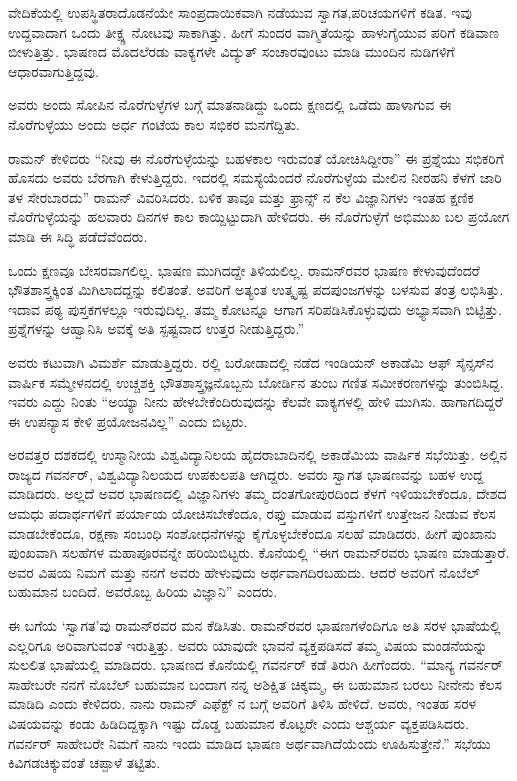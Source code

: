 ವೇದಿಕೆಯಲ್ಲಿ ಉಪಸ್ಥಿತರಾದೊಡನೆಯೇ ಸಾಂಪ್ರದಾಯಿಕವಾಗಿ ನಡೆಯುವ ಸ್ವಾಗತ,\break ಪರಿಚಯಗಳಿಗೆ ಕಡಿತ. ಇವು ಉದ್ದವಾದಾಗ ಒಂದು ತೀಕ್ಷ್ಣ ನೋಟವು ಸಾಕಾಗಿತ್ತು. ಹೀಗೆ ಸುಂದರ ವಾಗ್ಮಿತೆಯನ್ನು ಹಾಳುಗೈಯುವ ಪರಿಗೆ ಕಡಿವಾಣ ಬೀಳುತ್ತಿತ್ತು. ಭಾಷಣದ ಮೊದಲೆರಡು ವಾಕ್ಯಗಳೇ ವಿದ್ಯುತ್ ಸಂಚಾರವುಂಟು ಮಾಡಿ ಮುಂದಿನ ನುಡಿಗಳಿಗೆ ಆಧಾರವಾಗುತ್ತಿದ್ದವು.

ಅವರು ಅಂದು ಸೋಪಿನ ನೊರೆಗುಳ್ಳೆಗಳ ಬಗ್ಗೆ ಮಾತನಾಡಿದ್ದು ಒಂದು ಕ್ಷಣದಲ್ಲಿ ಒಡೆದು ಹಾಳಾಗುವ ಈ ನೊರೆಗುಳ್ಳೆಯು ಅಂದು ಅರ್ಧ ಗಂಟೆಯ ಕಾಲ ಸಭಿಕರ ಮನಗೆದ್ದಿತು.

ರಾಮನ್ ಕೇಳಿದರು  “ನೀವು ಈ ನೊರೆಗುಳ್ಳೆಯನ್ನು ಬಹಳಕಾಲ ಇರುವಂತೆ ಯೋಚಿಸಿದ್ದೀರಾ” ಈ ಪ್ರಶ್ನೆಯು ಸಭಿಕರಿಗೆ ಹೊಸದು ಅವರು ಬೆರಗಾಗಿ ಕೇಳುತ್ತಿದ್ದರು. ಇದರಲ್ಲಿ ಸಮಸ್ಯೆಯೆಂದರೆ ನೊರೆಗುಳ್ಳೆಯ ಮೇಲಿನ ನೀರಹನಿ ಕೆಳಗೆ ಜಾರಿ ತಳ ಸೇರಬಾರದು” \enginline{-}ರಾಮನ್ ವಿವರಿಸಿದರು. ಬಳಿಕ ತಾವೂ ಮತ್ತು ಫ್ರಾನ್ಸ್ ನ ಕೆಲ ವಿಜ್ಞಾನಿಗಳು ಇಂತಹ ಕ್ಷಣಿಕ ನೊರೆಗುಳ್ಳೆಯನ್ನು ಹಲವಾರು ದಿನಗಳ ಕಾಲ ಕಾಯ್ದಿಟ್ಟುದಾಗಿ ಹೇಳಿದರು. ಈ ನೊರೆಗುಳ್ಳೆಗೆ ಅಭಿಮುಖ ಬಲ ಪ್ರಯೋಗ ಮಾಡಿ ಈ ಸಿದ್ಧಿ ಪಡೆದೆವೆಂದರು.

ಒಂದು ಕ್ಷಣವೂ ಬೇಸರವಾಗಲಿಲ್ಲ. ಭಾಷಣ ಮುಗಿದದ್ದೇ ತಿಳಿಯಲಿಲ್ಲ. ರಾಮನ್‍ರವರ ಭಾಷಣ ಕೇಳುವುದೆಂದರೆ ಭೌತಶಾಸ್ತ್ರಕ್ಕಿಂತ ಮಿಗಿಲಾದದ್ದನ್ನು ಕಲಿತಂತೆ. ಅವರಿಗೆ ಅತ್ಯಂತ ಉತ್ಕೃಷ್ಟ ಪದಪುಂಜಗಳನ್ನು ಬಳಸುವ ತಂತ್ರ ಲಭಿಸಿತ್ತು. ಇದಾವ ಪಠ್ಯ ಪುಸ್ತಕಗಳಲ್ಲೂ ಇರುವುದಿಲ್ಲ. ತಮ್ಮ ಕೋಟನ್ನೂ ಆಗಾಗ ಸರಿಪಡಿಸಿಕೊಳ್ಳುವುದು ಅಭ್ಯಾಸವಾಗಿ ಬಿಟ್ಟಿತ್ತು. ಪ್ರಶ್ನೆಗಳನ್ನು ಆಹ್ವಾನಿಸಿ ಅವಕ್ಕೆ ಅತಿ ಸ್ಪಷ್ಟವಾದ ಉತ್ತರ ನೀಡುತ್ತಿದ್ದರು.”

ಅವರು ಕಟುವಾಗಿ ವಿಮರ್ಶೆ ಮಾಡುತ್ತಿದ್ದರು. ರಲ್ಲಿ ಬರೋಡಾದಲ್ಲಿ ನಡೆದ ಇಂಡಿಯನ್ ಅಕಾಡೆಮಿ ಆಫ್ ಸೈನ್ಸಸ್‍ನ ವಾರ್ಷಿಕ ಸಮ್ಮೇಳನದಲ್ಲಿ ಉಚ್ಚಶಕ್ತಿ ಭೌತಶಾಸ್ತ್ರಜ್ಞನೊಬ್ಬನು ಬೋರ್ಡಿನ ತುಂಬ ಗಣಿತ ಸಮೀಕರಣಗಳನ್ನು ತುಂಬಿಸಿದ್ದ. ಇವರು ಎದ್ದು ನಿಂತು “ಅಯ್ಯಾ ನೀನು ಹೇಳಬೇಕೆಂದಿರುವುದನ್ನು ಕೆಲವೇ ವಾಕ್ಯಗಳಲ್ಲಿ ಹೇಳಿ ಮುಗಿಸು. ಹಾಗಾಗದಿದ್ದರೆ ಈ ಉಪನ್ಯಾಸ ಕೇಳಿ ಪ್ರಯೋಜನವಿಲ್ಲ” ಎಂದು ಬಿಟ್ಟರು.

\newpage

ಅರವತ್ತರ ದಶಕದಲ್ಲಿ ಉಸ್ಮಾನೀಯ ವಿಶ್ವವಿದ್ಯಾನಿಲಯ ಹೈದರಾಬಾದಿನಲ್ಲಿ ಅಕಾಡೆಮಿಯ ವಾರ್ಷಿಕ ಸಭೆಯಿತ್ತು. ಅಲ್ಲಿನ ರಾಜ್ಯದ ಗವರ್ನರ್, ವಿಶ್ವವಿದ್ಯಾನಿಲಯದ ಉಪಕುಲಪತಿ ಆಗಿದ್ದರು. ಅವರು ಸ್ವಾಗತ ಭಾಷಣವನ್ನು ಬಹಳ ಉದ್ದ ಮಾಡಿದರು. ಅಲ್ಲದೆ ಅವರ ಭಾಷಣದಲ್ಲಿ ವಿಜ್ಞಾನಿಗಳು ತಮ್ಮ ದಂತಗೋಪುರದಿಂದ ಕೆಳಗೆ ಇಳಿಯಬೇಕೆಂದೂ, ದೇಶದ ಆಮಧು ಪದಾರ್ಥಗಳಿಗೆ ಪರ್ಯಾಯ ಯೋಚಿಸಬೇಕೆಂದೂ, ರಫ್ತು ಮಾಡುವ ವಸ್ತುಗಳಿಗೆ ಉತ್ತೇಜನ ನೀಡುವ ಕೆಲಸ ಮಾಡಬೇಕೆಂದೂ, ರಕ್ಷಣಾ ಸಂಬಂಧಿ ಸಂಶೋಧನೆಗಳನ್ನು ಕೈಗೊಳ್ಳಬೇಕೆಂದೂ ಸಲಹೆ ಮಾಡಿದರು. ಹೀಗೆ ಪುಂಖಾನು ಪುಂಖವಾಗಿ ಸಲಹೆಗಳ ಮಹಾಪೂರವನ್ನೇ ಹರಿಯಿಬಿಟ್ಟರು. ಕೊನೆಯಲ್ಲಿ “ಈಗ ರಾಮನ್‍ರವರು ಭಾಷಣ ಮಾಡುತ್ತಾರೆ. ಅವರ ವಿಷಯ \textit{} ನಿಮಗೆ ಮತ್ತು ನನಗೆ ಅವರು ಹೇಳುವುದು ಅರ್ಥವಾಗದಿರಬಹುದು. ಆದರೆ ಅವರಿಗೆ ನೊಬೆಲ್ ಬಹುಮಾನ ಬಂದಿದೆ. ಅವರೊಬ್ಬ ಹಿರಿಯ ವಿಜ್ಞಾನಿ” ಎಂದರು.

ಈ ಬಗೆಯ ‘ಸ್ವಾಗತ’ವು ರಾಮನ್‍ರವರ ಮನ ಕೆಡಿಸಿತು. ರಾಮನ್‍ರವರ ಭಾಷಣಗಳೆಂದಿಗೂ ಅತಿ ಸರಳ ಭಾಷೆಯಲ್ಲಿ ಎಲ್ಲರಿಗೂ ಅರಿವಾಗುವಂತೆ ಇರುತ್ತಿತ್ತು. ಅವರು ಯಾವುದೇ ಭಾವನೆ ವ್ಯಕ್ತಪಡಿಸದೆ ತಮ್ಮ ವಿಷಯ ಮಂಡನೆಯನ್ನು ಸುಲಲಿತ ಭಾಷೆಯಲ್ಲಿ ಮಾಡಿದರು. ಭಾಷಣದ ಕೊನೆಯಲ್ಲಿ ಗವರ್ನರ್ ಕಡೆ ತಿರುಗಿ ಹೀಗೆಂದರು. “ಮಾನ್ಯ ಗವರ್ನರ್ ಸಾಹೇಬರೇ ನನಗೆ ನೊಬೆಲ್ ಬಹುಮಾನ ಬಂದಾಗ ನನ್ನ ಅಶಿಕ್ಷಿತ ಚಿಕ್ಕಮ್ಮ, ಈ ಬಹುಮಾನ ಬರಲು ನೀನೇನು ಕೆಲಸ ಮಾಡಿದಿ ಎಂದು ಕೇಳಿದರು. ನಾನು ರಾಮನ್ ಎಫೆಕ್ಟ್ ನ ಬಗ್ಗೆ ಅವರಿಗೆ ತಿಳಿಸಿ ಹೇಳಿದೆ. ಅವರು, ಇಂತಹ ಸರಳ ವಿಷಯವನ್ನು ಕಂಡು ಹಿಡಿದಿದ್ದಕ್ಕಾಗಿ ಇಷ್ಟು ದೊಡ್ಡ ಬಹುಮಾನ ಕೊಟ್ಟರೇ ಎಂದು ಆಶ್ಚರ್ಯ ವ್ಯಕ್ತಪಡಿಸಿದರು. ಗವರ್ನರ್ ಸಾಹೇಬರೇ ನಿಮಗೆ ನಾನು ಇಂದು ಮಾಡಿದ ಭಾಷಣ ಅರ್ಥವಾಗಿದೆಯೆಂದು ಊಹಿಸುತ್ತೇನೆ.” ಸಭೆಯು ಕಿವಿಗಡಚಿಕ್ಕುವಂತೆ ಚಪ್ಪಾಳೆ ತಟ್ಟಿತು.

